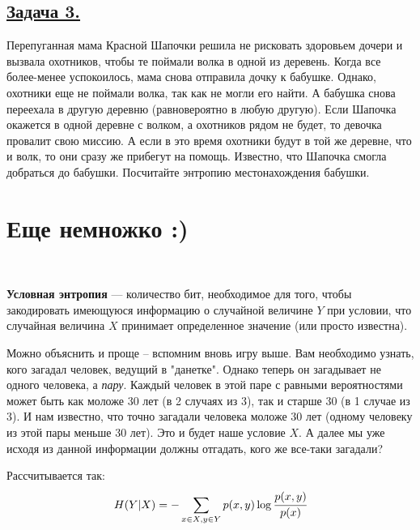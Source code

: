 \subsection*{\hyperref[sec:sol_problem3]{Задача 3.}}\label{sec:problem3} Перепуганная мама Красной Шапочки решила не рисковать здоровьем дочери и вызвала охотников, чтобы те поймали волка в одной из деревень. Когда все более-менее успокоилось, мама снова отправила дочку к бабушке. Однако, охотники еще не поймали волка, так как не могли его найти. А бабушка снова переехала в другую деревню (равновероятно в любую другую). Если Шапочка окажется в одной деревне с волком, а охотников рядом не будет, то девочка провалит свою миссию. А если в это время охотники будут в той же деревне, что и волк, то они сразу же прибегут на помощь. Известно, что Шапочка смогла добраться до бабушки. Посчитайте энтропию местонахождения бабушки.
\\
\section*{Еще немножко :)}~\
\\

\begin{siderules}
    \textbf{Условная энтропия} --- количество бит, необходимое для того, чтобы закодировать имеющуюся информацию о случайной величине $Y$ при условии, что случайная величина $X$ принимает определенное значение (или просто известна).
\end{siderules}

Можно объяснить и проще -- вспомним вновь игру выше. Вам необходимо узнать, кого загадал человек, ведущий в "данетке". Однако теперь он загадывает не одного человека, а \textit{пару}. Каждый человек в этой паре с равными вероятностями может быть как моложе 30 лет (в 2 случаях из 3), так и старше 30 (в 1 случае из 3). И нам известно, что точно загадали человека моложе 30 лет (одному человеку из этой пары меньше 30 лет). Это и будет наше условие $X$. А далее мы уже исходя из данной информации должны отгадать, кого же все-таки загадали?

Рассчитывается так:
\[H(Y|X)=-\sum\limits_{x\in X, y\in Y} p(x, y)\log \cfrac{p(x, y)}{p(x)} \]

